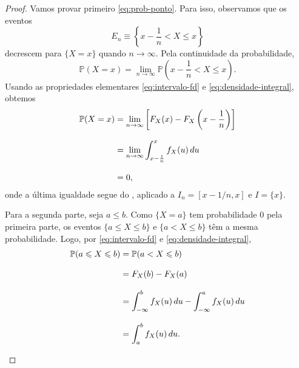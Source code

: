 \documentclass[12pt,portuguese]{article}
\theoremstyle{definition}
\theoremstyle{plainexercise}
\theoremstyle{starredexercise}
\theoremstyle{definition}
\begin{document}
\begin{proof}
  Vamos provar primeiro \eqref{eq:prob-ponto}. Para isso, observamos que os
  eventos
  \[
  E_n\equiv \left\{ x - \frac{1}{n} < X \leqslant x \right\}
  \]
  decrescem para $\{X=x\}$ quando $n\to\infty$. Pela continuidade da
  probabilidade,
  \[
    \mathbb{P}(X=x)= \lim_{n\to\infty}
      \mathbb{P}\left( x - \frac{1}{n} < X \leqslant x\right).
  \]
  Usando as propriedades elementares \eqref{eq:intervalo-fd} e \eqref{eq:densidade-integral}, obtemos
  \[
    \begin{aligned}
      \mathbb{P}(X=x)
        &= \lim_{n\to\infty}
           \left[ F_X(x) - F_X\left(x - \frac{1}{n}\right)\right]
        \notag \\[0.3cm]
        &= \lim_{n\to\infty} \int_{x - \frac{1}{n}}^{x} f_X(u)\,du
        \notag \\[0.3cm]
        &=0,
    \end{aligned}
  \]
  onde a última igualdade segue do , aplicado a
  $I_n=[x-1/n,x]$ e $I=\{x\}$.

\medskip 

  Para a segunda parte, seja $a\leqslant b$. Como $\{X=a\}$ tem probabilidade
  $0$ pela primeira parte, os eventos $\{a\leqslant X\leqslant b\}$ e
  $\{a<X\leqslant b\}$ têm a mesma probabilidade. Logo, por
  \eqref{eq:intervalo-fd} e \eqref{eq:densidade-integral},
  \[
    \begin{aligned}
      \mathbb{P}(a\leqslant X\leqslant b)
        &= \mathbb{P}(a<X\leqslant b) \notag \\[0.3cm]
        &= F_X(b)-F_X(a) \notag \\[0.3cm]
        &= \int_{-\infty}^{b}f_X(u)\,du - \int_{-\infty}^{a}f_X(u)\,du \notag \\[0.3cm]
        &= \int_a^b f_X(u)\,du.
    \end{aligned}
  \]
\bigskip 


  \begin{center}
\end{center}
\end{proof}
\end{document}
